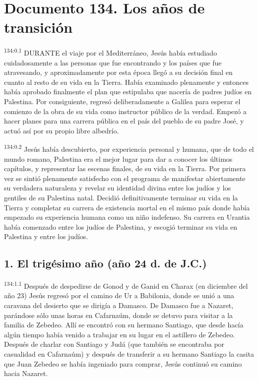 \chapter{Documento 134. Los años de transición}
\par 
\textsuperscript{134:0.1} DURANTE el viaje por el Mediterráneo, Jesús había estudiado cuidadosamente a las personas que fue encontrando y los países que fue atravesando, y aproximadamente por esta época llegó a su decisión final en cuanto al resto de su vida en la Tierra. Había examinado plenamente y entonces había aprobado finalmente el plan que estipulaba que nacería de padres judíos en Palestina. Por consiguiente, regresó deliberadamente a Galilea para esperar el comienzo de la obra de su vida como instructor público de la verdad. Empezó a hacer planes para una carrera pública en el país del pueblo de su padre José, y actuó así por su propio libre albedrío.

\par 
\textsuperscript{134:0.2} Jesús había descubierto, por experiencia personal y humana, que de todo el mundo romano, Palestina era el mejor lugar para dar a conocer los últimos capítulos, y representar las escenas finales, de su vida en la Tierra. Por primera vez se sintió plenamente satisfecho con el programa de manifestar abiertamente su verdadera naturaleza y revelar su identidad divina entre los judíos y los gentiles de su Palestina natal. Decidió definitivamente terminar su vida en la Tierra y completar su carrera de existencia mortal en el mismo país donde había empezado su experiencia humana como un niño indefenso. Su carrera en Urantia había comenzado entre los judíos de Palestina, y escogió terminar su vida en Palestina y entre los judíos.

\section*{1. El trigésimo año (año 24 d. de J.C.)}
\par 
\textsuperscript{134:1.1} Después de despedirse de Gonod y de Ganid en Charax (en diciembre del año 23) Jesús regresó por el camino de Ur a Babilonia, donde se unió a una caravana del desierto que se dirigía a Damasco. De Damasco fue a Nazaret, parándose sólo unas horas en Cafarnaúm, donde se detuvo para visitar a la familia de Zebedeo. Allí se encontró con su hermano Santiago, que desde hacía algún tiempo había venido a trabajar en su lugar en el astillero de Zebedeo. Después de charlar con Santiago y Judá (que también se encontraba por casualidad en Cafarnaúm) y después de transferir a su hermano Santiago la casita que Juan Zebedeo se había ingeniado para comprar, Jesús continuó su camino hacia Nazaret.

